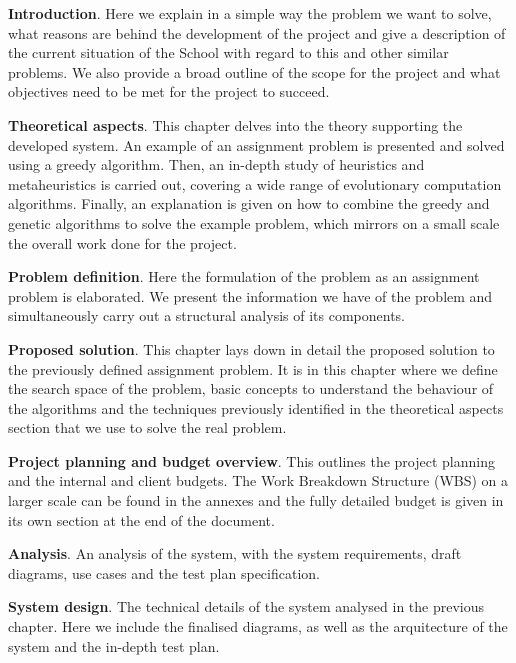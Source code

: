 \begin{description}

    \item \textbf{Introduction}. Here we explain in a simple way the problem we want to solve, what reasons are behind the development of the project and give a description of the current situation of the School with regard to this and other similar problems. We also provide a broad outline of the scope for the project and what objectives need to be met for the project to succeed.

    \item \textbf{Theoretical aspects}. This chapter delves into the theory supporting the developed system. An example of an assignment problem is presented and solved using a greedy algorithm. Then, an in-depth study of heuristics and metaheuristics is carried out, covering a wide range of evolutionary computation algorithms. Finally, an explanation is given on how to combine the greedy and genetic algorithms to solve the example problem, which mirrors on a small scale the overall work done for the project.

    \item \textbf{Problem definition}. Here the formulation of the problem as an assignment problem is elaborated. We present the information we have of the problem and simultaneously carry out a structural analysis of its components. 

    \item \textbf{Proposed solution}. This chapter lays down in detail the proposed solution to the previously defined assignment problem. It is in this chapter where we define the search space of the problem, basic concepts to understand the behaviour of the algorithms and the techniques previously identified in the theoretical aspects section that we use to solve the real problem. 

    \item \textbf{Project planning and budget overview}. This outlines the project planning and the internal and client budgets. The Work Breakdown Structure (WBS) on a larger scale can be found in the annexes and the fully detailed budget is given in its own section at the end of the document. 

    \item \textbf{Analysis}. An analysis of the system, with the system requirements, draft diagrams, use cases and the test plan specification. 

    \item \textbf{System design}. The technical details of the system analysed in the previous chapter. Here we include the finalised diagrams, as well as the arquitecture of the system and the in-depth test plan.


\end{description}

